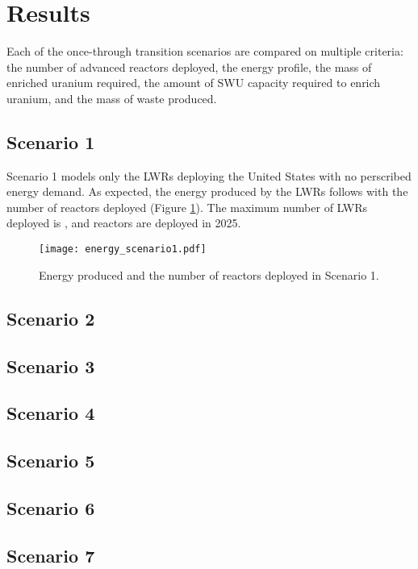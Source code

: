 \section{Results}
Each of the once-through transition scenarios are compared on multiple 
criteria: the number of advanced reactors deployed, the energy profile, 
the mass of enriched 
uranium required, the amount of \gls{SWU} capacity required to enrich uranium,
and the mass of waste produced. 

\subsection{Scenario 1}
Scenario 1 models only the \glspl{LWR} deploying the United States with no 
perscribed energy demand. As expected, the energy 
produced by the \glspl{LWR} follows with the number of reactors deployed
(Figure \ref{fig:energy1}). The maximum number of \glspl{LWR} deployed is 
, and reactors are deployed in 2025. 

\begin{figure}
    \centering
    \texttt{[image: energy\_scenario1.pdf]}
    \caption{Energy produced and the number of reactors deployed in Scenario 1.}
    \label{fig:energy1}
\end{figure}

\subsection{Scenario 2}

\subsection{Scenario 3}

\subsection{Scenario 4}

\subsection{Scenario 5}

\subsection{Scenario 6}

\subsection{Scenario 7}

